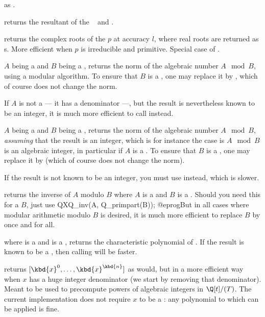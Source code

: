  as .

 returns the resultant of the
~ and .

 returns the complex roots of the
 $p$ at accuracy $l$, where real roots are returned as s.
More efficient when $p$ is irreducible and primitive. Special case
of .


 $A$ being a  and $B$ being a
, returns the norm of the algebraic number $A \mod B$, using a
modular algorithm. To ensure that $B$ is a , one may replace it by
, which of course does not change the norm.

If $A$ is not a  --- it has a denominator ---, but the result is
nevertheless known to be an integer, it is much more efficient to call
 instead.

 $A$ being a  and $B$
being a , returns the norm of the algebraic number $A \mod B$,
\emph{assuming} that the result is an integer, which is for instance the case
is $A\mod B$ is an algebraic integer, in particular if $A$ is a . To
ensure that $B$ is a , one may replace it by 
(which of course does not change the norm).

If the result is not known to be an integer, you must use 
instead, which is slower.

 returns the inverse of $A$ modulo $B$
where $A$ is a  and $B$ is a . Should you need this for
a  $B$, just use
\bprog
  QXQ_inv(A, Q_primpart(B));
@eprog\noindent But in all cases where modular arithmetic modulo $B$ is
desired, it is much more efficient to replace $B$ by 
once and for all.

 where  is a  and
 is a , returns the characteristic polynomial of .
If the result is known to be a , then calling  will
be faster.

 returns $[\kbd{x}^0, \dots,
\kbd{x}^\kbd{n}]$ as  would, but in a more efficient way when
$x$ has a huge integer denominator (we start by removing that denominator).
Meant to be used to precompute powers of algebraic integers in $\Q[t]/(T)$.
The current implementation does not require $x$ to be a : any
polynomial to which  can be applied is fine.


